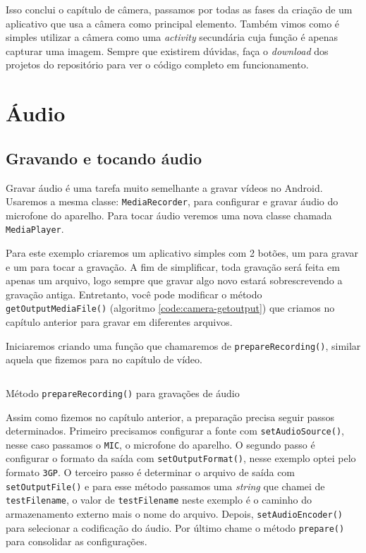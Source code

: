 \documentclass[a4paper,12pt,brazil,oneside]{book}
\begin{document}
		Isso conclui o capítulo de câmera, passamos por todas as fases da criação de um aplicativo que usa a câmera como principal elemento. Também vimos como é simples utilizar a câmera como uma \emph{activity} secundária cuja função é apenas capturar uma imagem. Sempre que existirem dúvidas, faça o \emph{download} dos projetos do repositório para ver o código completo em funcionamento.

\chapter{Áudio}
	\section{Gravando e tocando áudio}

		Gravar áudio é uma tarefa muito semelhante a gravar vídeos no Android. Usaremos a mesma classe: \texttt{MediaRecorder}, para configurar e gravar áudio do microfone do aparelho. Para tocar áudio veremos uma nova classe chamada \texttt{MediaPlayer}.

		Para este exemplo criaremos um aplicativo simples com 2 botões, um para gravar e um para tocar a gravação. A fim de simplificar, toda gravação será feita em apenas um arquivo, logo sempre que gravar algo novo estará sobrescrevendo a gravação antiga. Entretanto, você pode modificar o método \texttt{getOutputMediaFile()} (algoritmo \ref{code:camera-getoutput}) que criamos no capítulo anterior para gravar em diferentes arquivos.

		Iniciaremos criando uma função que chamaremos de \texttt{prepareRecording()}, similar aquela que fizemos para no capítulo de vídeo.

		\begin{listing}[H]
		\inputminted[linenos=true,fontsize=\small,frame=lines, framesep=2mm, tabsize=2,numbersep=5pt]{java}{src/api/audio/prepare.java}
		\caption{Método \texttt{prepareRecording()} para gravações de áudio}
		\label{code:audioprepare}
		\end{listing} 		

		Assim como fizemos no capítulo anterior, a preparação precisa seguir passos determinados. Primeiro precisamos configurar a fonte com \texttt{setAudioSource()}, nesse caso passamos o \texttt{MIC}, o microfone do aparelho. O segundo passo é configurar o formato da saída com \texttt{setOutputFormat()}, nesse exemplo optei pelo formato \texttt{3GP}. O terceiro passo é determinar o arquivo de saída com \texttt{setOutputFile()} e para esse método passamos uma \emph{string} que chamei de \texttt{testFilename}, o valor de \texttt{testFilename} neste exemplo é o caminho do armazenamento externo mais o nome do arquivo. Depois, \texttt{setAudioEncoder()} para selecionar a codificação do áudio. Por último chame o método \texttt{prepare()} para consolidar as configurações.
\end{document}
